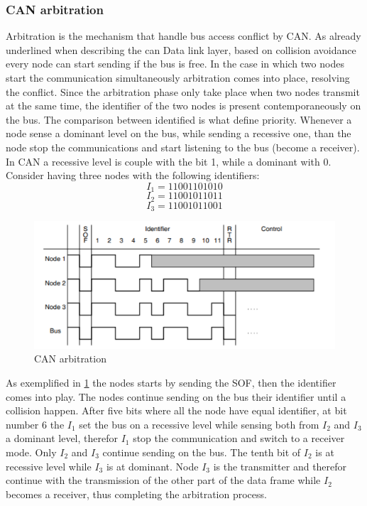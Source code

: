 \documentclass[../main.tex]{subfiles}
\begin{document}
\subsubsection{CAN arbitration}
Arbitration is the mechanism that handle \gls{bus} access conflict by \gls{CAN}. As already underlined when describing the can Data link layer, based on collision avoidance every node can start sending if the \gls{bus} is free. In the case in which two nodes start the communication simultaneously arbitration comes into place, resolving the conflict. Since the arbitration phase only take place when two nodes transmit at the same time, the identifier of the two nodes is present contemporaneously on the \gls{bus}. The comparison between identified is what define priority. Whenever a node sense a dominant level on the \gls{bus}, while sending a recessive one, than the node stop the communications and start listening to the \gls{bus} (become a receiver). In \gls{CAN} a recessive level is couple with the bit 1, while a dominant with 0. Consider having three nodes with the following identifiers:
\begin{equation}
I_{1} = 11001101010
\end{equation}
\begin{equation}
I_{2} = 11001011011
\end{equation}
\begin{equation}
I_{3} = 11001011001
\end{equation}
\begin{figure}[ht]
    \centering
    \includegraphics[width=\linewidth]{images_folder/can_arbitration.png}
    \caption{CAN arbitration}
    \label{fig:CANABR}
\end{figure}
As exemplified in \ref{fig:CANABR} the nodes starts by sending the \gls{SOF}, then the identifier comes into play. The nodes continue sending on the \gls{bus} their identifier until a collision happen. After five bits where all the node have equal identifier, at bit number 6 the $I_1$ set the \gls{bus} on a recessive level while sensing both from $I_2$ and $I_3$ a dominant level, therefor $I_1$ stop the communication and switch to a receiver mode. Only $I_2$ and $I_3$ continue sending on the \gls{bus}. The tenth bit of $I_2$ is at recessive level while $I_3$ is at dominant. Node $I_3$ is the transmitter and therefor continue with the transmission of the other part of the data frame while $I_2$ becomes a receiver, thus completing the arbitration process.\\
\end{document}
